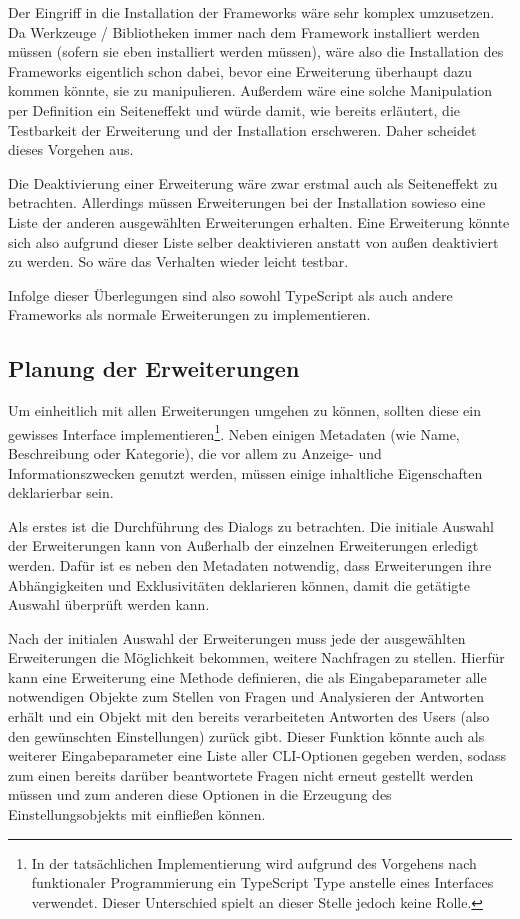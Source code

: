 Der Eingriff in die Installation der Frameworks wäre sehr komplex umzusetzen. Da Werkzeuge / Bibliotheken immer nach dem Framework installiert werden müssen (sofern sie eben installiert werden müssen), wäre also die Installation des Frameworks eigentlich schon dabei, bevor eine Erweiterung überhaupt dazu kommen könnte, sie zu manipulieren. Außerdem wäre eine solche Manipulation per Definition ein Seiteneffekt und würde damit, wie bereits erläutert, die Testbarkeit der Erweiterung und der Installation erschweren. Daher scheidet dieses Vorgehen aus.

Die Deaktivierung einer Erweiterung wäre zwar erstmal auch als Seiteneffekt zu betrachten. Allerdings müssen Erweiterungen bei der Installation sowieso eine Liste der anderen ausgewählten Erweiterungen erhalten. Eine Erweiterung könnte sich also aufgrund dieser Liste selber deaktivieren anstatt von außen deaktiviert zu werden. So wäre das Verhalten wieder leicht testbar.

Infolge dieser Überlegungen sind also sowohl TypeScript als auch andere Frameworks als normale Erweiterungen zu implementieren.

\subsection{Planung der Erweiterungen}
Um einheitlich mit allen Erweiterungen umgehen zu können, sollten diese ein gewisses Interface implementieren\footnote{In der tatsächlichen Implementierung wird aufgrund des Vorgehens nach funktionaler Programmierung ein TypeScript Type anstelle eines Interfaces verwendet. Dieser Unterschied spielt an dieser Stelle jedoch keine Rolle.}. Neben einigen Metadaten (wie Name, Beschreibung oder Kategorie), die vor allem zu Anzeige- und Informationszwecken genutzt werden, müssen einige inhaltliche Eigenschaften deklarierbar sein.

Als erstes ist die Durchführung des Dialogs zu betrachten. Die initiale Auswahl der Erweiterungen kann von Außerhalb der einzelnen Erweiterungen erledigt werden. Dafür ist es neben den Metadaten notwendig, dass Erweiterungen ihre Abhängigkeiten und Exklusivitäten deklarieren können, damit die getätigte Auswahl überprüft werden kann.

Nach der initialen Auswahl der Erweiterungen muss jede der ausgewählten Erweiterungen die Möglichkeit bekommen, weitere Nachfragen zu stellen. Hierfür kann eine Erweiterung eine Methode definieren, die als Eingabeparameter alle notwendigen Objekte zum Stellen von Fragen und Analysieren der Antworten erhält und ein Objekt mit den bereits verarbeiteten Antworten des Users (also den gewünschten Einstellungen) zurück gibt. Dieser Funktion könnte auch als weiterer Eingabeparameter eine Liste aller \gls{CLI}-Optionen gegeben werden, sodass zum einen bereits darüber beantwortete Fragen nicht erneut gestellt werden müssen und zum anderen diese Optionen in die Erzeugung des Einstellungsobjekts mit einfließen können.

